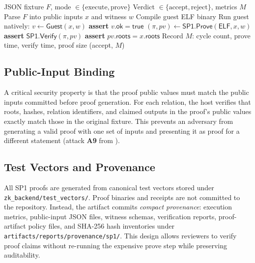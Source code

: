 \begin{algorithm}[!t]
\caption{SP1 Relation Prove/Verify Workflow}
\label{alg:sp1-workflow}
\begin{algorithmic}[1]
\Require JSON fixture $F$, mode $\in \{\text{execute}, \text{prove}\}$
\Ensure Verdict $\in \{\text{accept}, \text{reject}\}$, metrics $M$
\State Parse $F$ into public inputs $x$ and witness $w$
\State Compile guest ELF binary
  \State Run guest natively: $v \gets \mathsf{Guest}(x, w)$
  \State \textbf{assert} $v.\mathsf{ok} = \mathsf{true}$
  \State $(\pi, \mathit{pv}) \gets \mathsf{SP1.Prove}(\mathsf{ELF}, x, w)$
  \State \textbf{assert} $\mathsf{SP1.Verify}(\pi, \mathit{pv})$
  \State \textbf{assert} $\mathit{pv}.\mathsf{roots} = x.\mathsf{roots}$
  \State Record $M$: cycle count, prove time, verify time, proof size
\EndIf
\State \Return (accept, $M$)
\end{algorithmic}
\end{algorithm}

\subsection{Public-Input Binding}

A critical security property is that the proof public values must match the
public inputs committed before proof generation. For each relation, the host
verifies that roots, hashes, relation identifiers, and claimed outputs in the
proof's public values exactly match those in the original fixture. This prevents
an adversary from generating a valid proof with one set of inputs and
presenting it as proof for a different statement (attack \textbf{A9} from
).

\subsection{Test Vectors and Provenance}

All SP1 proofs are generated from canonical test vectors stored under
\texttt{zk\_backend/test\_vectors/}. Proof binaries and receipts are not
committed to the repository. Instead, the artifact commits \emph{compact
provenance}: execution metrics, public-input JSON files, witness schemas,
verification reports, proof-artifact policy files, and SHA-256 hash inventories
under \texttt{artifacts/reports/provenance/sp1/}. This design allows reviewers
to verify proof claims without re-running the expensive prove step while
preserving auditability.

